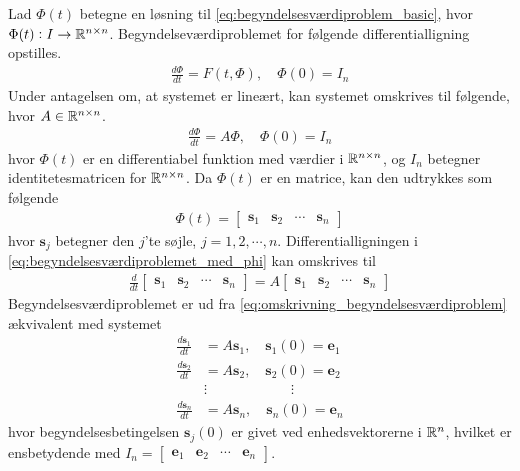 Lad $\Phi(t)$ betegne en løsning til \eqref{eq:begyndelsesværdiproblem_basic}, hvor $\Phi(t): I\to \mathbb{R}^{n \times n}$. Begyndelseværdiproblemet for følgende differentialligning opstilles.
%
\begin{align*}
    \frac{d\Phi}{dt}= F(t,\Phi), \quad \Phi(0)=I_n
\end{align*}
%
Under antagelsen om, at systemet er lineært, 
kan systemet omskrives til følgende, hvor $A \in \mathbb{R}^{n \times n}$.
%
%
\begin{align}\label{eq:begyndelsesværdiproblemet_med_phi}
  \frac{d\Phi}{dt}=A\Phi, \quad \Phi(0)=I_n
\end{align}
%
hvor $\Phi(t)$ er en differentiabel funktion med værdier i $\mathbb{R}^{n \times n}$, og $I_n$ betegner identitetesmatricen for $\mathbb{R}^{n\times n}$. Da $\Phi(t)$ er en matrice, kan den udtrykkes som følgende
\begin{align*}
    \Phi(t)=\begin{bmatrix}\mathbf{s}_1 & \mathbf{s}_2 & \cdots & \mathbf{s}_n\end{bmatrix}
\end{align*}
%
hvor $\textbf{s}_j$ betegner den $j$'te søjle, $j=1, 2, \cdots, n$. Differentialligningen i \eqref{eq:begyndelsesværdiproblemet_med_phi} kan omskrives til
\begin{align}
    \frac{d}{dt}\begin{bmatrix}\mathbf{s}_1 & \mathbf{s}_2 & \cdots & \mathbf{s}_n\end{bmatrix}=A\begin{bmatrix}\mathbf{s}_1 & \mathbf{s}_2 & \cdots & \mathbf{s}_n\end{bmatrix} \label{eq:omskrivning_begyndelsesværdiproblem}
\end{align}
%
Begyndelsesværdiproblemet er ud fra \eqref{eq:omskrivning_begyndelsesværdiproblem} ækvivalent med systemet
\begin{align*}
    \frac{d \mathbf{s}_1}{dt}&=A\mathbf{s}_1, \quad \mathbf{s}_1(0)=\mathbf{e}_1\\
    \frac{d \mathbf{s}_2}{dt}&=A\mathbf{s}_2, \quad \mathbf{s}_2(0)=\mathbf{e}_2\\
    &\vdots \quad\quad\quad\quad\quad\quad \vdots\\
    \frac{d \mathbf{s}_n}{dt}&=A\mathbf{s}_n, \quad \mathbf{s}_n(0)=\mathbf{e}_n
\end{align*}
%
hvor begyndelsesbetingelsen $\textbf{s}_j(0)$ er givet ved enhedsvektorerne i $\mathbb{R}^n$, hvilket er ensbetydende med $I_{n}=\begin{bmatrix}\textbf{e}_1 & \textbf{e}_2 & \cdots & \textbf{e}_n\end{bmatrix}$.

